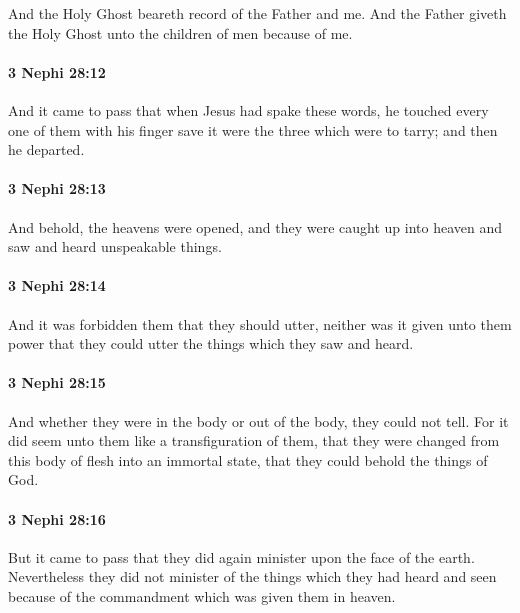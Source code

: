 			And the Holy Ghost beareth record of the Father and me.
			And the Father giveth the Holy Ghost unto the children of men because of me.

		\paragraph{3 Nephi 28:12} %
			\label{3NEPHI-28-12}

			And it came to pass that when Jesus had spake these words,
			he touched every one of them with his finger
			save it were the three which were to tarry;
			and then he departed.

		\paragraph{3 Nephi 28:13} %
			\label{3NEPHI-28-13}

			And behold, the heavens were opened,
			and they were caught up into heaven
			and saw and heard unspeakable things.

		\paragraph{3 Nephi 28:14} %
			\label{3NEPHI-28-14}

			And it was forbidden them that they should utter,
			neither was it given unto them power
			that they could utter the things which they saw and heard.

		\paragraph{3 Nephi 28:15} %
			\label{3NEPHI-28-15}

			And whether they were in the body or out of the body, they could not tell.
			For it did seem unto them like a transfiguration of them,
			that they were changed from this body of flesh into an immortal state,
			that they could behold the things of God.

		\paragraph{3 Nephi 28:16} %
			\label{3NEPHI-28-16}

			But it came to pass that they did again minister upon the face of the earth.
			Nevertheless they did not minister of the things which they had heard and seen
			because of the commandment which was given them in heaven.

